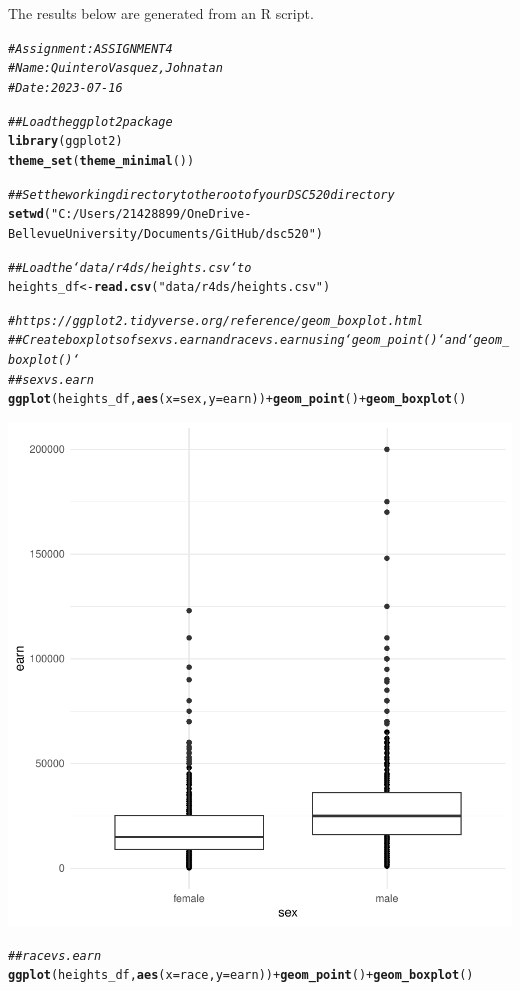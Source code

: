 \documentclass{article}\usepackage[]{graphicx}\usepackage[]{xcolor}
\makeatletter
\newcommand{\hlstr}[1]{\textcolor[rgb]{0.192,0.494,0.8}{#1}}%
\newcommand{\hlcom}[1]{\textcolor[rgb]{0.678,0.584,0.686}{\textit{#1}}}%
\newcommand{\hlopt}[1]{\textcolor[rgb]{0,0,0}{#1}}%
\newcommand{\hlstd}[1]{\textcolor[rgb]{0.345,0.345,0.345}{#1}}%
\newcommand{\hlkwb}[1]{\textcolor[rgb]{0.69,0.353,0.396}{#1}}%
\newcommand{\hlkwc}[1]{\textcolor[rgb]{0.333,0.667,0.333}{#1}}%
\newcommand{\hlkwd}[1]{\textcolor[rgb]{0.737,0.353,0.396}{\textbf{#1}}}%
\newenvironment{kframe}{%
 \def\at@end@of@kframe{}%
 \ifinner\ifhmode%
  \def\at@end@of@kframe{\end{minipage}}%
  \begin{minipage}{\columnwidth}%
 \fi\fi%
 \def\FrameCommand##1{\hskip\@totalleftmargin \hskip-\fboxsep
 \colorbox{shadecolor}{##1}\hskip-\fboxsep
     \hskip-\linewidth \hskip-\@totalleftmargin \hskip\columnwidth}%
 \MakeFramed {\advance\hsize-\width
   \@totalleftmargin\z@ \linewidth\hsize
   \@setminipage}}%
 {\par\unskip\endMakeFramed%
 \at@end@of@kframe}
\newenvironment{knitrout}{}{} %
\makeatother
\begin{document}
The results below are generated from an R script.

\begin{knitrout}
\color{fgcolor}\begin{kframe}
\begin{alltt}
\hlcom{# Assignment: ASSIGNMENT 4}
\hlcom{# Name: Quintero Vasquez, Johnatan}
\hlcom{# Date: 2023-07-16}

\hlcom{## Load the ggplot2 package}
\hlkwd{library}\hlstd{(ggplot2)}
\hlkwd{theme_set}\hlstd{(}\hlkwd{theme_minimal}\hlstd{())}

\hlcom{## Set the working directory to the root of your DSC 520 directory}
\hlkwd{setwd}\hlstd{(}\hlstr{"C:/Users/21428899/OneDrive-Bellevue University/Documents/GitHub/dsc520"}\hlstd{)}

\hlcom{## Load the `data/r4ds/heights.csv` to}
\hlstd{heights_df} \hlkwb{<-} \hlkwd{read.csv}\hlstd{(}\hlstr{"data/r4ds/heights.csv"}\hlstd{)}

\hlcom{# https://ggplot2.tidyverse.org/reference/geom_boxplot.html}
\hlcom{## Create boxplots of sex vs. earn and race vs. earn using `geom_point()` and `geom_boxplot()`}
\hlcom{## sex vs. earn}
\hlkwd{ggplot}\hlstd{(heights_df,} \hlkwd{aes}\hlstd{(}\hlkwc{x} \hlstd{= sex,} \hlkwc{y} \hlstd{= earn))} \hlopt{+} \hlkwd{geom_point}\hlstd{()} \hlopt{+} \hlkwd{geom_boxplot}\hlstd{()}
\end{alltt}
\end{kframe}

{\centering \includegraphics[width=.6\linewidth]{figure/assignment-04-Quintero-Vasquez-Johnatan-Rnwauto-report-1} 

}


\begin{kframe}\begin{alltt}
\hlcom{## race vs. earn}
\hlkwd{ggplot}\hlstd{(heights_df,} \hlkwd{aes}\hlstd{(}\hlkwc{x} \hlstd{= race,} \hlkwc{y} \hlstd{= earn))} \hlopt{+} \hlkwd{geom_point}\hlstd{()} \hlopt{+} \hlkwd{geom_boxplot}\hlstd{()}
\end{alltt}
\end{kframe}


\end{knitrout}
\end{document}
